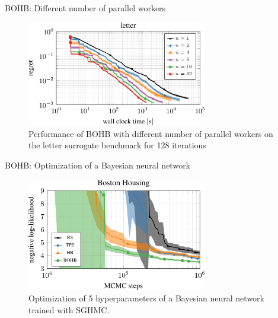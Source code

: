 \begin{frame}{BOHB: Different number of parallel workers}
\begin{figure}
    \centering
    \includegraphics[width=0.70\textwidth]{../w07_hpo_speedup/images/bohb/parallelization_letter.png}
    \caption{Performance of BOHB with different number of parallel workers on the letter surrogate benchmark for 128 iterations}
\end{figure}

\end{frame}
\begin{frame}{BOHB: Optimization of a Bayesian neural network}
\begin{figure}
    \centering
    \includegraphics[width=0.70\textwidth]{../w07_hpo_speedup/images/bohb/bnn_boston-1.png}
    \caption{Optimization of 5 hyperparameters of a Bayesian neural network trained with SGHMC.}
\end{figure}

\end{frame}

